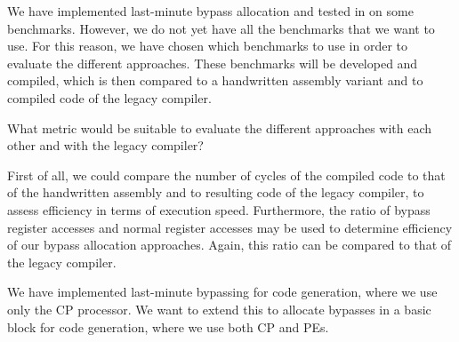 We have implemented last-minute bypass allocation and tested in on some benchmarks. However, we do not yet have all the benchmarks that we want to use. For this reason, we have chosen which benchmarks to use in order to evaluate the different approaches. These benchmarks will be developed and compiled, which is then compared to a handwritten assembly variant and to compiled code of the legacy compiler. 

What metric would be suitable to evaluate the different approaches with each other and with the legacy compiler?

First of all, we could compare the number of cycles of the compiled code to that of the handwritten assembly and to resulting code of the legacy compiler, to assess efficiency in terms of execution speed. Furthermore, the ratio of bypass register accesses and normal register accesses may be used to determine efficiency of our bypass allocation approaches. Again, this ratio can be compared to that of the legacy compiler.

We have implemented last-minute bypassing for code generation, where we use only the CP processor. We want to extend this to allocate bypasses in a basic block for code generation, where we use both CP and PEs.

